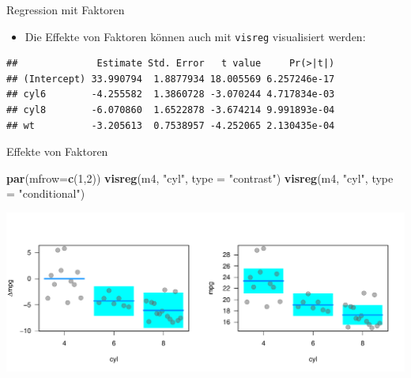\documentclass[ignorenonframetext,]{beamer}
\newenvironment{Shaded}{\begin{snugshade}}{\end{snugshade}}
\newcommand{\CommentTok}[1]{\textcolor[rgb]{0.56,0.35,0.01}{\textit{#1}}}
\newcommand{\DataTypeTok}[1]{\textcolor[rgb]{0.13,0.29,0.53}{#1}}
\newcommand{\DecValTok}[1]{\textcolor[rgb]{0.00,0.00,0.81}{#1}}
\newcommand{\KeywordTok}[1]{\textcolor[rgb]{0.13,0.29,0.53}{\textbf{#1}}}
\newcommand{\NormalTok}[1]{#1}
\newcommand{\OperatorTok}[1]{\textcolor[rgb]{0.81,0.36,0.00}{\textbf{#1}}}
\newcommand{\StringTok}[1]{\textcolor[rgb]{0.31,0.60,0.02}{#1}}
\providecommand{\tightlist}{%
  \setlength{\itemsep}{0pt}\setlength{\parskip}{0pt}}
\begin{document}
\begin{frame}[fragile]{Regression mit Faktoren}
\protect\hypertarget{regression-mit-faktoren}{}

\begin{itemize}
\tightlist
\item
  Die Effekte von Faktoren können auch mit \texttt{visreg} visualisiert
  werden:
\end{itemize}

\begin{Shaded}
\end{Shaded}

\begin{verbatim}
##              Estimate Std. Error   t value     Pr(>|t|)
## (Intercept) 33.990794  1.8877934 18.005569 6.257246e-17
## cyl6        -4.255582  1.3860728 -3.070244 4.717834e-03
## cyl8        -6.070860  1.6522878 -3.674214 9.991893e-04
## wt          -3.205613  0.7538957 -4.252065 2.130435e-04
\end{verbatim}

\end{frame}

\begin{frame}[fragile]{Effekte von Faktoren}
\protect\hypertarget{effekte-von-faktoren}{}

\begin{Shaded}
\begin{Highlighting}[]
\KeywordTok{par}\NormalTok{(}\DataTypeTok{mfrow=}\KeywordTok{c}\NormalTok{(}\DecValTok{1}\NormalTok{,}\DecValTok{2}\NormalTok{))}
\KeywordTok{visreg}\NormalTok{(m4, }\StringTok{"cyl"}\NormalTok{, }\DataTypeTok{type =} \StringTok{"contrast"}\NormalTok{)}
\KeywordTok{visreg}\NormalTok{(m4, }\StringTok{"cyl"}\NormalTok{, }\DataTypeTok{type =} \StringTok{"conditional"}\NormalTok{)}
\end{Highlighting}
\end{Shaded}

\includegraphics{B3_linreg_files/figure-beamer/unnamed-chunk-36-1.pdf}

\end{frame}
\end{document}
